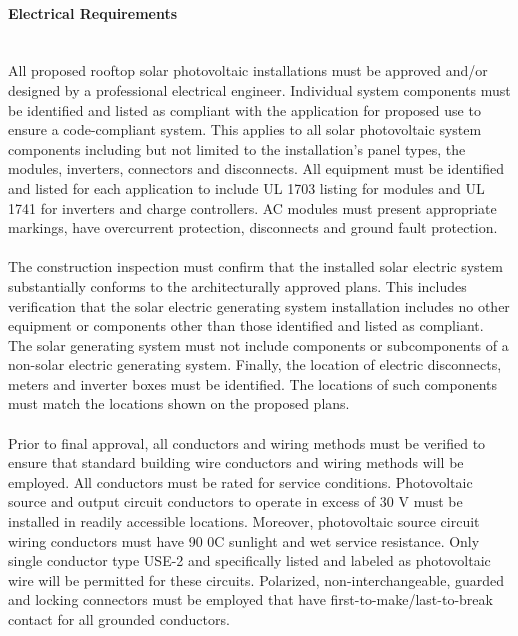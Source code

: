 \paragraph{Electrical Requirements}\mbox{ }\\
All proposed rooftop solar photovoltaic installations must be approved and/or designed by a professional electrical engineer. Individual system components must be identified and listed as compliant with the application for proposed use to ensure a code-compliant system. This applies to all solar photovoltaic system components including but not limited to the installation’s panel types, the modules, inverters, connectors and disconnects. All equipment must be identified and listed for each application to include UL 1703 listing for modules and UL 1741 for inverters and charge controllers. AC modules must present appropriate markings, have overcurrent protection, disconnects and ground fault protection.
\\\\
\noindent The construction inspection must confirm that the installed solar electric system substantially conforms to the architecturally approved plans. This includes verification that the solar electric generating system installation includes no other equipment or components other than those identified and listed as compliant. The solar generating system must not include components or subcomponents of a non-solar electric generating system. Finally, the location of electric disconnects, meters and inverter boxes must be identified. The locations of such components must match the locations shown on the proposed plans.
\\\\
\noindent Prior to final approval, all conductors and wiring methods must be verified to ensure that standard building wire conductors and wiring methods will be employed. All conductors must be rated for service conditions. Photovoltaic source and output circuit conductors to operate in excess of 30 V must be installed in readily accessible locations. Moreover, photovoltaic source circuit wiring conductors must have 90 0C sunlight and wet service resistance. Only single conductor type USE-2 and specifically listed and labeled as photovoltaic wire will be permitted for these circuits. Polarized, non-interchangeable, guarded and locking connectors must be employed that have first-to-make/last-to-break contact for all grounded conductors.

